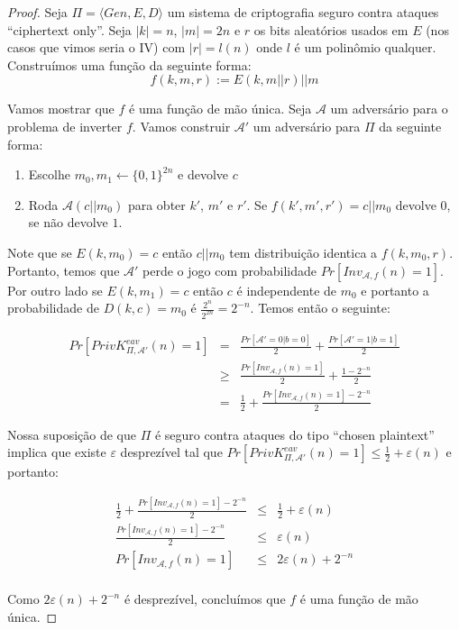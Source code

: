 \begin{proof}
Seja $\Pi = \langle Gen, E, D \rangle$ um sistema de criptografia seguro contra ataques ``ciphertext only''.
Seja $|k| = n$, $|m| = 2n$ e $r$ os bits aleatórios usados em $E$ (nos casos que vimos seria o IV) com $|r| = l(n)$ onde $l$ é um polinômio qualquer.
Construímos uma função da seguinte forma:
\begin{displaymath}
  f(k, m, r) := E(k, m||r)||m
\end{displaymath}

Vamos mostrar que $f$ é uma função de mão única.
Seja $\mathcal{A}$ um adversário para o problema de inverter $f$.
Vamos construir $\mathcal{A}'$ um adversário para $\Pi$ da seguinte forma:
\begin{enumerate}
\item Escolhe $m_0, m_1 \leftarrow \{0,1\}^{2n}$ e devolve $c$
\item Roda $\mathcal{A}(c||m_0)$ para obter $k'$, $m'$ e $r'$.
Se $f(k', m', r') = c ||m_0$ devolve $0$, se não devolve $1$.
\end{enumerate}
 
Note que se $E(k,m_0) = c$ então $c||m_0$ tem distribuição identica a $f(k, m_0, r)$.
Portanto, temos que $\mathcal{A}'$ perde o jogo com probabilidade $Pr[Inv_{\mathcal{A}, f}(n) = 1]$.
Por outro lado se $E(k, m_1) = c$ então $c$ é independente de $m_0$ e portanto a probabilidade de $D(k, c) = m_0 $ é $\frac{2^n}{2^{2n}} = 2^{-n}$.
Temos então o seguinte:


\begin{eqnarray*}
  Pr[PrivK_{\Pi, \mathcal{A}'}^{eav}(n) = 1] & = & \frac{Pr[\mathcal{A}' = 0 | b = 0]}{2} + \frac{Pr[\mathcal{A}' = 1 | b = 1]}{2}\\
  & \geq & \frac{Pr[Inv_{\mathcal{A},f}(n) = 1]}{2} + \frac{1 - 2^{-n}}{2}\\
  & = & \frac{1}{2} + \frac{Pr[Inv_{\mathcal{A},f}(n) = 1] - 2^{-n}}{2}
\end{eqnarray*}

Nossa suposição de que $\Pi$ é seguro contra ataques do tipo ``chosen plaintext'' implica que existe $\varepsilon$ desprezível tal que $Pr[PrivK_{\Pi, \mathcal{A}'}^{eav}(n) = 1] \leq \frac{1}{2} + \varepsilon(n)$ e portanto:

 \begin{eqnarray*}
  \frac{1}{2} + \frac{Pr[Inv_{\mathcal{A},f}(n) = 1] - 2^{-n}}{2} & \leq & \frac{1}{2} + \varepsilon(n)\\
  \frac{Pr[Inv_{\mathcal{A},f}(n) = 1] - 2^{-n}}{2} & \leq & \varepsilon(n)\\
  Pr[Inv_{\mathcal{A},f}(n) = 1] & \leq & 2\varepsilon(n) + 2^{-n}\\
\end{eqnarray*}

Como $2\varepsilon(n) + 2^{-n}$ é desprezível, concluímos que $f$ é uma função de mão única.

\end{proof}

